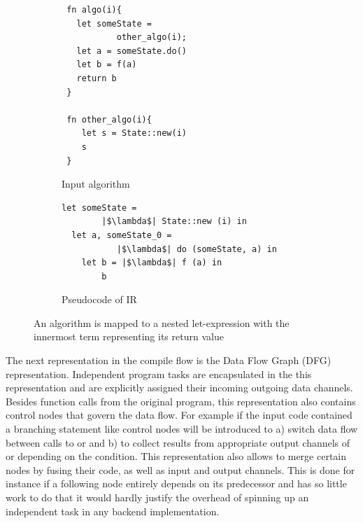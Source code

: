 \begin{figure}
    \centering
    \begin{subfigure}[b]{0.45\textwidth}
         \centering
         \begin{verbatim}
 fn algo(i){
   let someState = 
           other_algo(i);
   let a = someState.do()
   let b = f(a)
   return b
 }

 fn other_algo(i){
    let s = State::new(i)
    s
 }
            \end{verbatim}
         \caption{Input algorithm}
         \label{simplPyInput}
     \end{subfigure}
     \hfill
     \begin{subfigure}[b]{0.5\textwidth}
         \centering
         \begin{verbatim}
let someState = 
        |$\lambda$| State::new (i) in
  let a, someState_0 = 
           |$\lambda$| do (someState, a) in
    let b = |$\lambda$| f (a) in
        b
        \end{verbatim}
        \vspace{15mm}
    \caption{Pseudocode of IR}
         \label{simplIR}
    \end{subfigure}
\caption{An algorithm is mapped to a nested let-expression with the innermost term representing its return value}
\label{fig:funBodyTranslation}
\end{figure}


The next representation in the compile flow is the Data Flow Graph (DFG) representation. Independent program tasks are encapsulated in the this representation and are explicitly assigned their incoming outgoing data channels. Besides function calls from the original program, this representation also contains control nodes that govern the data flow. For example if the input code contained a branching statement like  control nodes will be introduced to a) switch data flow between calls to  or  and b) to collect results from appropriate output channels of  or  depending on the condition. This representation also allows to merge certain nodes by fusing their code, as well as input and output channels. This is done for instance if a following node entirely depends on its predecessor and has so little work to do that it would hardly justify the overhead of spinning up an independent task in any backend implementation.\\

